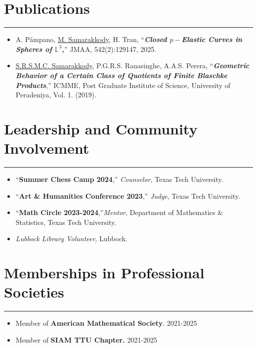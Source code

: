 \documentclass[12pt]{book}
\begin{document}
\section*{Publications}
\rule{\textwidth}{1pt}
\begin{itemize}
	\item A. P\'ampano, \underline{M. Samarakkody}, H. Tran, ``\textit{\textbf{Closed $p-$Elastic Curves in Spheres of $\mathbb{L}^{3}$,}}'' JMAA, 542(2):129147, 2025. 
 \item \underline{S.R.S.M.C. Samarakkody}, P.G.R.S. Ranasinghe, A.A.S. Perera, ``\textit{\textbf{Geometric Behavior of a Certain Class of Quotients of Finite Blaschke Products}},'' ICMME, Post Graduate Institute of Science, University of Peradeniya, Vol. 1. (2019).
\end{itemize}





 
 \section*{Leadership and Community Involvement}
\rule{\textwidth}{1pt}
\begin{itemize}
	\item ``\textbf{Summer Chess Camp 2024},'' \textit{Counselor}, Texas Tech University. 
	\item ``\textbf{Art \& Humanities Conference 2023},'' \textit{Judge}, Texas Tech University.  
	\item ``\textbf{Math Circle 2023-2024},''\textit{Mentor}, Department of Mathematics \& Statistics, Texas Tech University. 
	\item \textit{Lubbock Library Volunteer}, Lubbock.
\end{itemize}





\section*{Memberships in Professional Societies}
 \rule{\textwidth}{1pt}
 \begin{itemize}
 	\item Member of \textbf{American Mathematical Society}. \hfill  2021-2025
	\item Member of \textbf{SIAM TTU Chapter.} \hfill 2021-2025
 \end{itemize}
\end{document}
